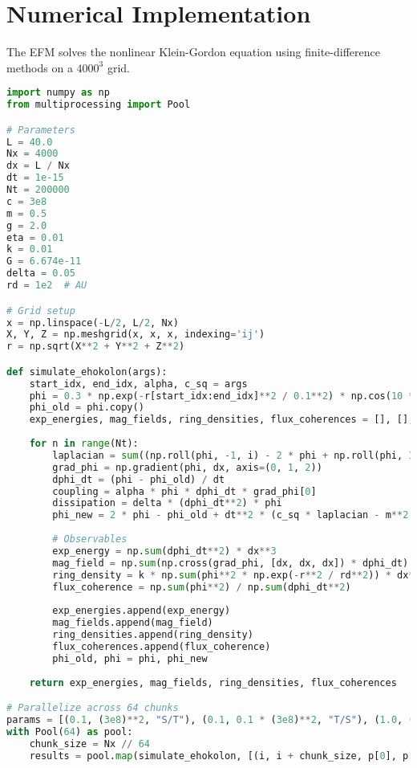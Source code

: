 \documentclass[11pt]{article}
\begin{document}
\section{Numerical Implementation}
The EFM solves the nonlinear Klein-Gordon equation using finite-difference methods on a \(4000^3\) grid.

\begin{lstlisting}[language=Python, caption={Fluxonic Explosion Event Simulation}, label=lst:simulation]
import numpy as np
from multiprocessing import Pool

# Parameters
L = 40.0
Nx = 4000
dx = L / Nx
dt = 1e-15
Nt = 200000
c = 3e8
m = 0.5
g = 2.0
eta = 0.01
k = 0.01
G = 6.674e-11
delta = 0.05
rd = 1e2  # AU

# Grid setup
x = np.linspace(-L/2, L/2, Nx)
X, Y, Z = np.meshgrid(x, x, x, indexing='ij')
r = np.sqrt(X**2 + Y**2 + Z**2)

def simulate_ehokolon(args):
    start_idx, end_idx, alpha, c_sq = args
    phi = 0.3 * np.exp(-r[start_idx:end_idx]**2 / 0.1**2) * np.cos(10 * X[start_idx:end_idx]) + 0.1 * np.random.rand(Nx//64, Nx, Nx)
    phi_old = phi.copy()
    exp_energies, mag_fields, ring_densities, flux_coherences = [], [], [], []
    
    for n in range(Nt):
        laplacian = sum((np.roll(phi, -1, i) - 2 * phi + np.roll(phi, 1, i)) / dx**2 for i in range(3))
        grad_phi = np.gradient(phi, dx, axis=(0, 1, 2))
        dphi_dt = (phi - phi_old) / dt
        coupling = alpha * phi * dphi_dt * grad_phi[0]
        dissipation = delta * (dphi_dt**2) * phi
        phi_new = 2 * phi - phi_old + dt**2 * (c_sq * laplacian - m**2 * phi - g * phi**3 - eta * phi**5 + coupling - dissipation)
        
        # Observables
        exp_energy = np.sum(dphi_dt**2) * dx**3
        mag_field = np.sum(np.cross(grad_phi, [dx, dx, dx]) * dphi_dt) * dx**3
        ring_density = k * np.sum(phi**2 * np.exp(-r**2 / rd**2)) * dx**3
        flux_coherence = np.sum(phi**2) / np.sum(dphi_dt**2)
        
        exp_energies.append(exp_energy)
        mag_fields.append(mag_field)
        ring_densities.append(ring_density)
        flux_coherences.append(flux_coherence)
        phi_old, phi = phi, phi_new
    
    return exp_energies, mag_fields, ring_densities, flux_coherences

# Parallelize across 64 chunks
params = [(0.1, (3e8)**2, "S/T"), (0.1, 0.1 * (3e8)**2, "T/S"), (1.0, (3e8)**2, "S=T")]
with Pool(64) as pool:
    chunk_size = Nx // 64
    results = pool.map(simulate_ehokolon, [(i, i + chunk_size, p[0], p[1]) for i in range(0, Nx, chunk_size) for p in params])
\end{lstlisting}
\end{document}
